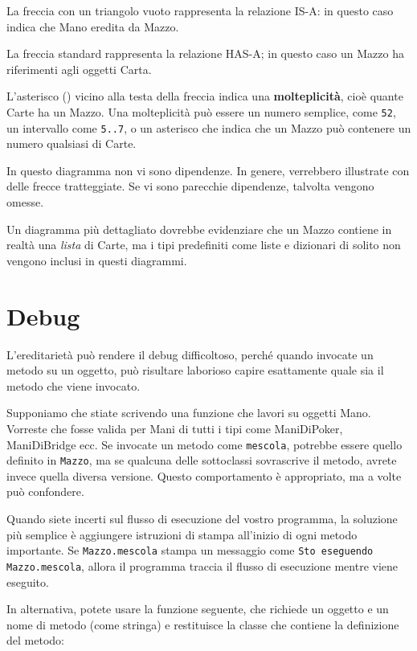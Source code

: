 \documentclass[10pt]{book}
\begin{document}
La freccia con un triangolo vuoto rappresenta la relazione IS-A: in questo caso indica che Mano eredita da Mazzo.

La freccia standard rappresenta la relazione HAS-A; in questo caso un Mazzo ha riferimenti agli oggetti Carta.

L'asterisco ({\tt *}) vicino alla testa della freccia indica una
{\bf molteplicità}, cioè quante Carte ha un Mazzo. Una molteplicità può essere un numero semplice, come {\tt 52}, un intervallo come {\tt 5..7}, o un asterisco che indica che un Mazzo può contenere un numero qualsiasi di Carte.

In questo diagramma non vi sono dipendenze. In genere, verrebbero illustrate con delle frecce tratteggiate. Se vi sono parecchie dipendenze, talvolta vengono omesse.

Un diagramma più dettagliato dovrebbe evidenziare che un Mazzo contiene in realtà una {\em lista} di Carte, ma i tipi predefiniti come liste e dizionari di solito non vengono inclusi in questi diagrammi.


\section{Debug}

L'ereditarietà può rendere il debug difficoltoso, perché quando invocate un metodo su un oggetto, può risultare laborioso capire esattamente quale sia il metodo che viene invocato.

Supponiamo che stiate scrivendo una funzione che lavori su oggetti Mano. Vorreste che fosse valida per Mani di tutti i tipi come ManiDiPoker, ManiDiBridge ecc. Se invocate un metodo come
{\tt mescola}, potrebbe essere quello definito in {\tt Mazzo},
ma se qualcuna delle sottoclassi sovrascrive il metodo, avrete invece quella diversa versione. Questo comportamento è appropriato, ma a volte può confondere.

Quando siete incerti sul flusso di esecuzione del vostro programma, la soluzione più semplice è aggiungere istruzioni di stampa all'inizio di ogni metodo importante. Se {\tt Mazzo.mescola} stampa un messaggio come {\tt Sto eseguendo Mazzo.mescola}, allora il programma traccia il flusso di esecuzione mentre viene eseguito.

In alternativa, potete usare la funzione seguente, che richiede un oggetto e un nome di metodo (come stringa) e restituisce la classe che contiene la definizione del metodo:
\end{document}
